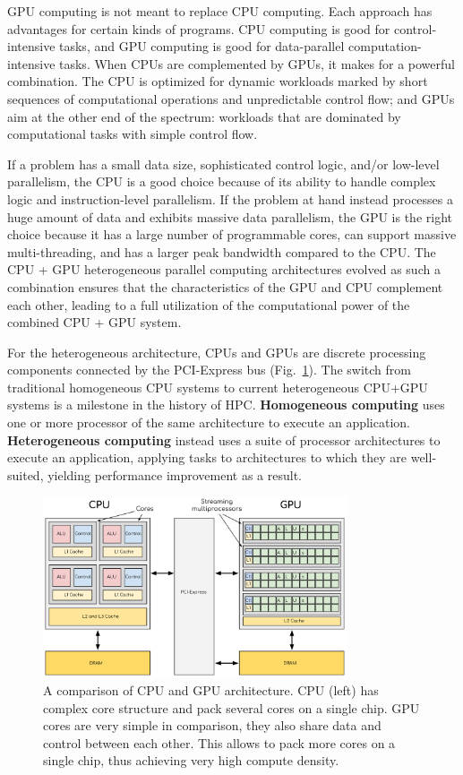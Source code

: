 \par
GPU computing is not meant to replace CPU computing.
Each approach has advantages for certain kinds of programs.
CPU computing is good for control-intensive tasks, and GPU computing is good for data-parallel computation-intensive tasks.
When CPUs are complemented by GPUs, it makes for a powerful combination.
The CPU is optimized for dynamic workloads marked by short sequences of computational operations and unpredictable control flow; and GPUs aim at the other end of the spectrum: workloads that are dominated by computational tasks with simple control flow. 


\par
If a problem has a small data size, sophisticated control logic, and/or low-level parallelism, the CPU is a good choice because of its ability to handle complex logic and instruction-level parallelism.
If the problem at hand instead processes a huge amount of data and exhibits massive data parallelism, the GPU is the right choice because it has a large number of programmable cores, can support massive multi-threading, and has a larger peak bandwidth compared to the CPU.
The CPU + GPU heterogeneous parallel computing architectures evolved as such a combination ensures that the characteristics of the GPU and CPU complement each other, leading to a full utilization of the computational power of the combined CPU + GPU system.


\par
For the heterogeneous architecture, CPUs and GPUs are discrete processing components connected by the PCI-Express bus (Fig.~\ref{fig:cpu_gpu_architecture}).
The switch from traditional homogeneous CPU systems to current heterogeneous CPU+GPU systems is a milestone in the history of HPC.
\textbf{Homogeneous computing} uses one or more processor of the same architecture to execute an application.
\textbf{Heterogeneous computing} instead uses a suite of processor architectures to execute an application, applying tasks to architectures to which they are well-suited, yielding performance improvement as a result.


\begin{figure}[htbp]
\centering\includegraphics[width=0.8\textwidth]{fig_hardware/cpu_gpu_architecture.png}
\caption{A comparison of CPU and GPU architecture. CPU (left) has complex core structure and pack several cores on a single chip. GPU cores are very simple in comparison, they also share data and control between each other. This allows to pack more cores on a single chip, thus achieving very high compute density.}\label{fig:cpu_gpu_architecture}
\end{figure}


